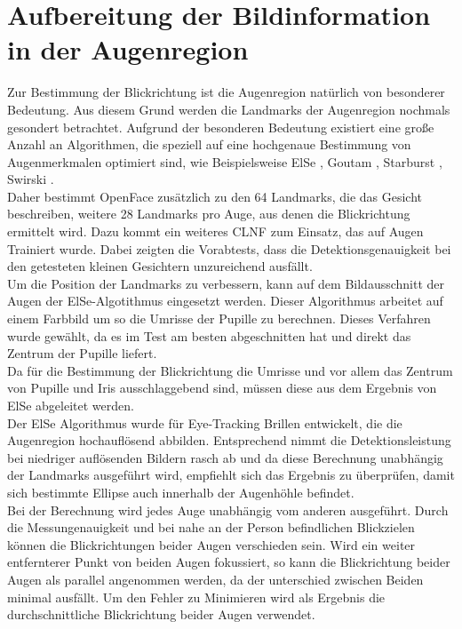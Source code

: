 \section{Aufbereitung der Bildinformation in der Augenregion}
\label{verbesserung_ElSe}
Zur Bestimmung der Blickrichtung ist die Augenregion natürlich von besonderer Bedeutung. Aus diesem Grund werden die Landmarks der Augenregion nochmals gesondert betrachtet. Aufgrund der besonderen Bedeutung existiert eine große Anzahl an Algorithmen, die speziell auf eine hochgenaue Bestimmung von Augenmerkmalen optimiert sind, wie Beispielsweise ElSe \cite{ElSe}, Goutam \cite{Eye_FastCorner}, Starburst \cite{Starburst}, Swirski \cite{Swirski2012}.\\
Daher bestimmt OpenFace zusätzlich zu den 64 Landmarks, die das Gesicht beschreiben, weitere 28 Landmarks pro Auge, aus denen die Blickrichtung ermittelt wird. Dazu kommt ein weiteres CLNF zum Einsatz, das auf Augen Trainiert wurde. Dabei zeigten die Vorabtests, dass die Detektionsgenauigkeit bei den getesteten kleinen Gesichtern unzureichend ausfällt.\\
Um die Position der Landmarks zu verbessern, kann auf dem Bildausschnitt der Augen der ElSe-Algotithmus eingesetzt werden. Dieser Algorithmus arbeitet auf einem Farbbild um so die Umrisse der Pupille zu berechnen. Dieses Verfahren wurde gewählt, da es im Test \cite{ElSe} am besten abgeschnitten hat und direkt das Zentrum der Pupille liefert.\\
Da für die Bestimmung der Blickrichtung die Umrisse und vor allem das Zentrum von Pupille und Iris ausschlaggebend sind, müssen diese aus dem Ergebnis von ElSe abgeleitet werden.\\
Der ElSe Algorithmus wurde für Eye-Tracking Brillen entwickelt, die die Augenregion hochauflösend abbilden. Entsprechend nimmt die Detektionsleistung bei niedriger auflösenden Bildern rasch ab und da diese Berechnung unabhängig der Landmarks ausgeführt wird, empfiehlt sich das Ergebnis zu überprüfen, damit sich bestimmte Ellipse auch innerhalb der Augenhöhle befindet.\\
Bei der Berechnung wird jedes Auge unabhängig vom anderen ausgeführt. Durch die Messungenauigkeit und bei nahe an der Person befindlichen Blickzielen können die Blickrichtungen beider Augen verschieden sein. Wird ein weiter entfernterer Punkt von beiden Augen fokussiert, so kann die Blickrichtung beider Augen als parallel angenommen werden, da der unterschied zwischen Beiden minimal ausfällt. Um den Fehler zu Minimieren wird als Ergebnis die durchschnittliche Blickrichtung beider Augen verwendet.

